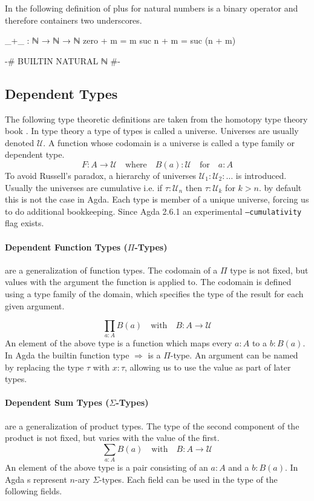\documentclass[10pt,a4paper,twoside]{report}
\begin{document}
In the following definition of plus for natural numbers \AgdaFunction{+} is a
binary operator and therefore containers two underscores.

\begin{code}
_+_ : ℕ → ℕ → ℕ
zero   + m = m
suc n  + m = suc (n + m)
\end{code}
\begin{code}[hide]
{-# BUILTIN NATURAL ℕ #-}
\end{code}

\subsection{Dependent Types}
The following type theoretic definitions are taken from the homotopy type theory
book \cite{hottbook}.
In type theory a type of types is called a universe.
Universes are usually denoted $\mathcal{U}$.
A function whose codomain is a universe is called a type family or dependent
type.
$$
F : A \rightarrow \mathcal{U} \quad\text{where}\quad B(a) : \mathcal{U}
\quad\text{for}\quad a : A
$$
To avoid Russell's paradox, a hierarchy of universes $\mathcal{U}_1 :
\mathcal{U}_2 : \dots$ is introduced.
Usually the universes are cumulative i.e. if $\tau : \mathcal{U}_n$ then
$\tau : \mathcal{U}_k$ for $k>n$.
by default this is not the case in Agda.
Each type is member of a unique universe, forcing us to do additional
bookkeeping.
Since Agda 2.6.1 an experimental \texttt{--cumulativity} flag exists.

\paragraph{Dependent Function Types ($\Pi$-Types)} are a generalization of
function types.
The codomain of a $\Pi$ type is not fixed, but values with the argument the
function is applied to.
The codomain is defined using a type family of the domain, which specifies the
type of the result for each given argument.

$$
\prod_{a : A} B(a) \quad \text{with}\quad B : A \rightarrow\mathcal{U}
$$
An element of the above type is a function which maps every $a : A$ to a $b :
B(a)$.
In Agda the builtin function type $\Rightarrow$ is a $\Pi$-type.
An argument can be named by replacing the type $\tau$ with $x : \tau$, allowing
us to use the value as part of later types.

\paragraph{Dependent Sum Types ($\Sigma$-Types)} are a generalization of product
types.
The type of the second component of the product is not fixed, but varies with
the value of the first.
$$
\sum_{a : A} B(a) \quad \text{with}\quad B : A \rightarrow\mathcal{U}
$$
An element of the above type is a pair consisting of an $a : A$ and a $b : B(a)$.
In Agda s represent $n$-ary $\Sigma$-types.
Each field can be used in the type of the following fields.
\end{document}
